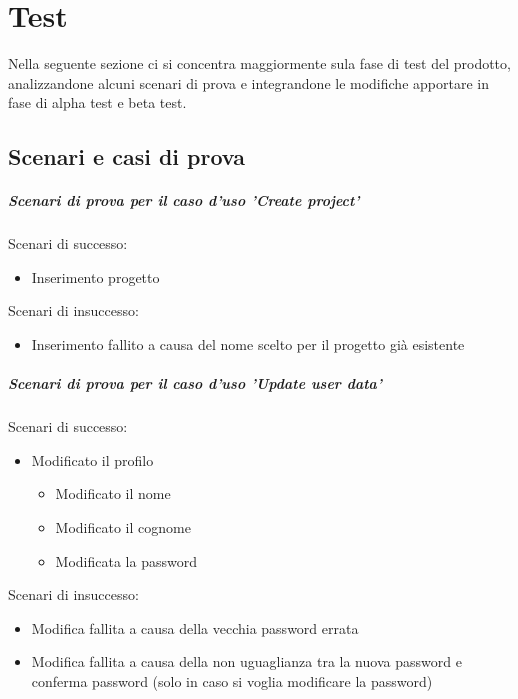 
\chapter{Test}\label{chap:test}
Nella seguente sezione ci si concentra maggiormente sula fase di test del 
prodotto, analizzandone alcuni scenari di prova e integrandone le modifiche 
apportare in fase di alpha test e beta test.

\section{Scenari e casi di prova}\label{sec:scenari-casi-prova}
\paragraph{Scenari di prova per il caso d'uso 'Create project'}
Scenari di successo:
\begin{itemize}
	\item Inserimento progetto
\end{itemize}
Scenari di insuccesso:
\begin{itemize}
	\item Inserimento fallito a causa del nome scelto per il progetto già 
	esistente
\end{itemize}

\paragraph{Scenari di prova per il caso d'uso 'Update user data'}
Scenari di successo: 
\begin{itemize}
	\item Modificato il profilo
	\begin{itemize}
		\item Modificato il nome
		\item Modificato il cognome
		\item Modificata la password
	\end{itemize}
\end{itemize}
Scenari di insuccesso:
\begin{itemize}
	\item Modifica fallita a causa della vecchia password errata
	\item Modifica fallita a causa della non uguaglianza tra la nuova password 
	e conferma password (solo in caso si voglia modificare la password)
\end{itemize}

